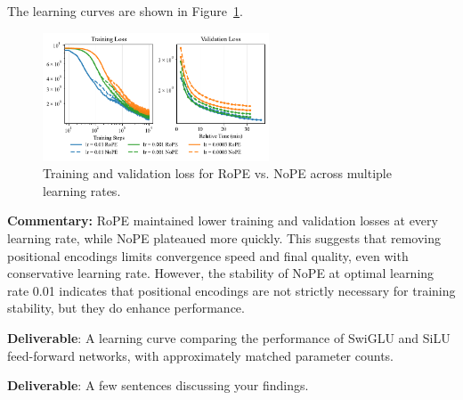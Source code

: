 \begin{answer}

The learning curves are shown in Figure~\ref{fig:rope_ablation}.

\begin{figure}[!htb]
    \centering
    \includegraphics[width=0.6\textwidth]{images/rope_ablation_experiments.pdf}
    \caption{Training and validation loss for RoPE vs. NoPE across multiple learning rates.}
    \label{fig:rope_ablation}
\end{figure}

\textbf{Commentary:} RoPE maintained lower training and validation losses at every learning rate, while NoPE plateaued more quickly. This suggests that removing positional encodings limits convergence speed and final quality, even with conservative learning rate. However, the stability of NoPE at optimal learning rate 0.01 indicates that positional encodings are not strictly necessary for training stability, but they do enhance performance.

\end{answer}


\textbf{Deliverable}: A learning curve comparing the performance of SwiGLU and SiLU feed-forward networks, with approximately matched parameter counts.

\textbf{Deliverable}: A few sentences discussing your findings.

